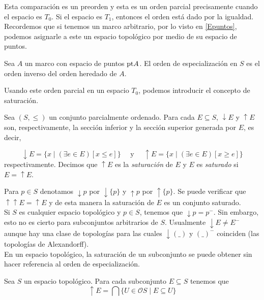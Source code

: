 Esta comparación es un preorden y esta es un orden parcial precisamente cuando el espacio es $T_0$. Si el espacio es $T_1$, entonces el orden está dado por la igualdad.\\

Recordemos que si tenemos un marco arbitrario, por lo visto en \ref{Epuntos}, podemos asignarle a este un espacio topológico por medio de su espacio de puntos.

\begin{lem}
    Sea $A$ un marco con espacio de puntos $\mathrm{pt} A$. El orden de especialización en $S$ es el orden inverso del orden heredado de $A$.
\end{lem}

Usando este orden parcial en un espacio $T_0$, podemos introducir el concepto de saturación.

\begin{dfn}\label{SupInf}
    Sea $(S, \leq)$ un conjunto parcialmente ordenado. Para cada $E\subseteq S$, $\downarrow{E}$ y $\uparrow{E}$ son, respectivamente, la sección inferior y la sección superior generada por $E$, es decir,

    \[
    \downarrow{E}=\{x\mid (\exists e\in E) [x\leq e]\}\quad \mbox{ y } \quad \uparrow{E}=\{x\mid (\exists e\in E) [x\geq e]\}
    \]
    respectivamente. Decimos que $\uparrow{E}$ es la \emph{saturación} de $E$ y $E$ es \emph{saturado} si $E=\uparrow{E}$.
\end{dfn}

Para $p\in S$ denotamos $\downarrow{p}$ por $\downarrow{\{p\}}$ y $\uparrow{p}$ por $\uparrow{\{p\}}$. Se puede verificar que $\uparrow\uparrow{E}=\uparrow{E}$ y de esta manera la saturación de $E$ es un conjunto saturado.\\

Si $S$ es cualquier espacio topológico y $p\in S$, tenemos que $\downarrow{p}=p^-$. Sin embargo, esto no es cierto para subconjuntos arbitrarios de $S$. Usualmente $\downarrow{E}\neq E^-$ aunque hay una clase de topologías para las cuales $\downarrow{(\_)}$ y $(\_)^-$ coinciden (las topologías de Alexandorff).\\

En un espacio topológico, la saturación de un subconjunto se puede obtener sin hacer referencia al orden de especialización.

\begin{lem}\label{LemSup}
    Sea $S$ un espacio topológico. Para cada subconjunto $E\subseteq S$ tenemos que
    \[
    \uparrow{E}=\bigcap\{U\in \mathcal{O}S\mid E\subseteq U\}
    \]
\end{lem}

